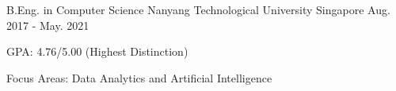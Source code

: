 

\begin{cventries}


  \cventry
    {B.Eng. in Computer Science} %
    {Nanyang Technological University} %
    {Singapore} %
    {Aug. 2017 - May. 2021} %
    {
      \begin{cvitems} %
        \item {GPA: 4.76/5.00 (Highest Distinction)}
        \item {Focus Areas: Data Analytics and Artificial Intelligence}
      \end{cvitems}
    }


\end{cventries}
